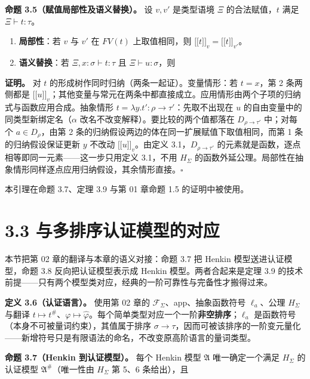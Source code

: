 \documentclass[UTF8,a4paper,zihao=-4,fontset=windows,openany]{ctexbook}
\newcommand{\mcsdisplay}[1]{%
  \par\addvspace{0.7em}%
  \sbox{\mcsmathbox}{\ensuremath{\displaystyle #1}}%
  \ifdim\wd\mcsmathbox>\linewidth
    \noindent\resizebox{\linewidth}{!}{\usebox{\mcsmathbox}}%
  \else
    \noindent\hspace*{\fill}\usebox{\mcsmathbox}\hspace*{\fill}%
  \fi
  \par\addvspace{0.7em}%
}
\def\ensuremath#1{#1}%
\providecommand{\llbracket}{\mathopen{[\![}}
\providecommand{\rrbracket}{\mathclose{]\!]}}
\begin{document}
\textbf{命题 3.5（赋值局部性及语义替换）。} 设 \(v,v'\) 是类型语境 \(\Xi\) 的合法赋值，\(t\) 满足 \(\Xi\vdash t:\tau\)。

\begin{enumerate}
\item \textbf{局部性}：若 \(v\) 与 \(v'\) 在 \(FV(t)\) 上取值相同，则 \(\llbracket t\rrbracket_v=\llbracket t\rrbracket_{v'}\)。
\item \textbf{语义替换}：若 \(\Xi,x:\sigma\vdash t:\tau\) 且 \(\Xi\vdash u:\sigma\)，则
\end{enumerate}

\mcsdisplay{\llbracket t[u/x]\rrbracket_v
=\llbracket t\rrbracket_{v[x:=\llbracket u\rrbracket_v]}.}
\noindent \textbf{证明。} 对 \(t\) 的形成树作同时归纳（两条一起证）。变量情形：若 \(t=x\)，第 2 条两侧都是 \(\llbracket u\rrbracket_v\)；其他变量与常元在两条中都直接成立。应用情形由两个子项的归纳式与函数应用合成。抽象情形 \(t=\lambda y.t':\rho\to\tau'\)：先取不出现在 \(u\) 的自由变量中的同类型新绑定名（\(\alpha\) 改名不改变解释）。要比较的两个值都落在 \(D_{\rho\to\tau'}\) 中；对每个 \(a\in D_\rho\)，由第 2 条的归纳假设两边的体在同一扩展赋值下取值相同，而第 1 条的归纳假设保证更新 \(y\) 不改动 \(\llbracket u\rrbracket_v\)。由定义 3.1，\(D_{\rho\to\tau'}\) 的元素就是函数，逐点相等即同一元素——这一步只用定义 3.1，不用 \(H_\Sigma\) 的函数外延公理。局部性在抽象情形同样逐点应用归纳假设，其余情形直接。\(\square\)

本引理在命题 3.7、定理 3.9 与第 01 章命题 1.5 的证明中被使用。

\section{3.3 与多排序认证模型的对应}
本节把第 02 章的翻译与本章的语义对接：命题 3.7 把 Henkin 模型送进认证模型，命题 3.8 反向把认证模型表示成 Henkin 模型。两者合起来是定理 3.9 的技术前提——只有两个模型类对应，经典的一阶可靠性与完备性才搬得过来。

\textbf{定义 3.6（认证语言）。} 使用第 02 章的 \(\mathcal F_\Sigma\)、app、抽象函数符号 \(\ell_a\)、公理 \(H_\Sigma\) 与翻译 \(t\mapsto t^\#\)、\(\varphi\mapsto\widehat\varphi\)。每个简单类型对应一个一阶\textbf{非空排序}；\(\ell_a\) 是函数符号（本身不可被量词约束），其值属于排序 \(\sigma\to\tau\)，因而可被该排序的一阶变元量化——新增符号只是有限语法的命名，不改变原高阶语言的量词类型。

\textbf{命题 3.7（Henkin 到认证模型）。} 每个 Henkin 模型 \(\mathfrak A\) 唯一确定一个满足 \(H_\Sigma\) 的认证模型 \(\mathfrak A^{\#}\)（唯一性由 \(H_\Sigma\) 第 5、6 条给出），且
\end{document}
